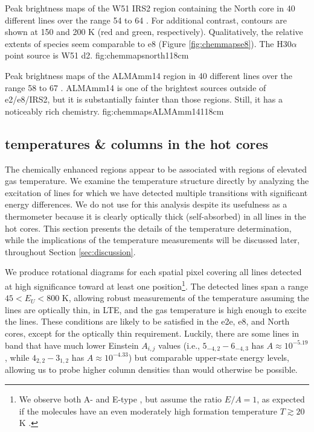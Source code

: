 \documentclass{emulateapj}
\begin{document}
{Peak brightness maps of the W51 IRS2 region containing the North core in 40 different
lines over the range 54 to 64 \kms. 
For additional contrast, contours are shown at 150 and 200 K
(red and green, respectively).
Qualitatively, the relative extents of
species seem comparable to e8 (Figure \ref{fig:chemmapse8}).  The H30$\alpha$
point source is W51 d2.
}{fig:chemmapsnorth}{1}{18cm}

{Peak brightness maps of the ALMAmm14 region in 40 different lines over the
range 58 to 67 \kms.  ALMAmm14 is one of the brightest sources outside of
e2/e8/IRS2, but it is substantially fainter than those regions.  Still, it has
a noticeably rich chemistry.
}{fig:chemmapsALMAmm14}{1}{18cm}


\subsection{\methanol temperatures \& columns in the hot cores}
\label{sec:ch3ohtem}
\label{sec:methanol}
The  chemically enhanced regions appear to be associated with regions of
elevated gas temperature.  We examine the temperature structure directly by
analyzing the excitation of lines for which we have detected multiple
transitions with significant energy differences.  We do not use \formaldehyde
for this analysis despite its usefulness as a thermometer because it is clearly
optically thick (self-absorbed) in all lines in the hot cores.
This section presents the details of the temperature determination, while 
the implications of the temperature measurements will be discussed later,
throughout Section \ref{sec:discussion}.

We produce rotational diagrams for each spatial pixel covering all \methanol
lines detected at high significance toward at least one position\footnote{We
observe both A- and E-type \methanol, but assume the ratio $E/A=1$, 
as expected if the molecules have an even moderately high formation 
temperature $T\gtrsim20$ K \citep{Wirstrom2011a}.}.  The detected
lines span a range $45 < E_U < 800$ K, allowing robust measurements of the
temperature
assuming the lines are optically thin, in LTE, and the gas temperature is high
enough to excite the lines.  These conditions are likely to be satisfied in the
e2e, e8, and North cores, except for the optically thin requirement.  Luckily,
there are some lines in band that have much lower Einstein $A_{i,j}$ values 
(i.e., \methanol $5_{-4,2} - 6_{-4,3}$ has $A\approx10^{-5.19}$, while
\methanol $4_{2,2}-3_{1,2}$ has $A\approx10^{-4.33}$)
but comparable upper-state energy levels, allowing us to probe higher column
densities than would otherwise be possible.
\end{document}
